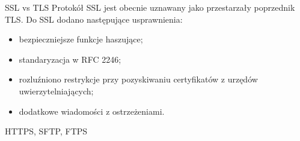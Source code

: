 \begin{frame}{SSL vs TLS}
	Protokół SSL jest obecnie uznawany jako przestarzały poprzednik TLS. Do SSL dodano następujące usprawnienia:
	\begin{itemize}
		\item bezpieczniejsze funkcje haszujące;
		\item standaryzacja w RFC 2246;
		\item rozluźniono restrykcje przy pozyskiwaniu certyfikatów z urzędów uwierzytelniających;
		\item dodatkowe wiadomości z ostrzeżeniami.
	\end{itemize} 
\end{frame}

\begin{frame}{HTTPS, SFTP, FTPS}
	
\end{frame}


